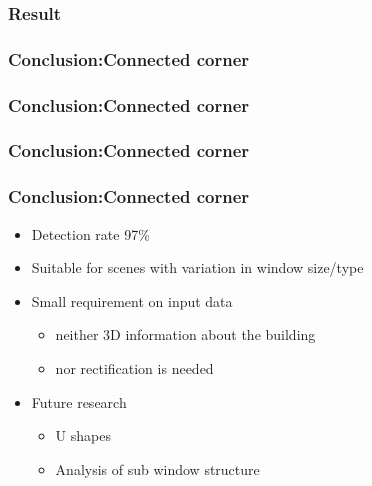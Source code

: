 \documentclass{beamer}
\begin{document}
\frame
{
	\frametitle{Result}
}

% 
% 

\frame
{
	\frametitle{Conclusion:Connected corner}
}

\frame
{
	\frametitle{Conclusion:Connected corner}
}

\frame
{
	\frametitle{Conclusion:Connected corner}
}


\frame
{
	\frametitle{Conclusion:Connected corner}
	\begin{itemize}
	\item <+-| alert@+> Detection rate 97\%
	\item <+-| alert@+> Suitable for scenes with variation in window size/type
	\item <+-| alert@+> Small requirement on input data
		\begin{itemize}
		\item <+-| alert@+> neither 3D information about the building 
		\item <+-| alert@+> nor rectification is needed
		\end{itemize}
	\item <+-| alert@+> Future research
		\begin{itemize}			
		\item <+-| alert@+> U shapes 
		\item <+-| alert@+> Analysis of sub window structure
		\end{itemize}			
	\end{itemize}
}
\end{document}
